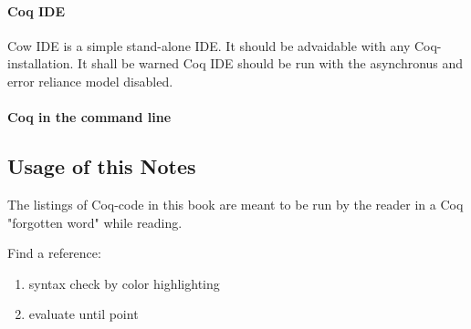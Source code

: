 \paragraph{Coq IDE}
Cow IDE is a simple stand-alone IDE. It should be advaidable with any Coq-installation. 
It shall be warned Coq IDE should be run with the asynchronus and error reliance model disabled. 

\paragraph{Coq in the command line}

\subsection{Usage of this Notes}

The listings of Coq-code in this book are meant to be run by the reader in a Coq "forgotten word" while reading.

Find a reference:
\begin{enumerate}
\item syntax check by color highlighting
\item evaluate until point
\end{enumerate}




